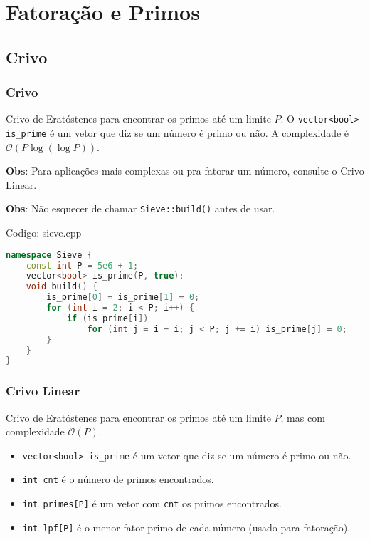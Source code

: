 \documentclass[10pt, a4paper, oneside]{book}
\begin{document}
\section{Fatoração e Primos}
\subsection{Crivo}
\subsubsection{Crivo}


Crivo de Eratóstenes para encontrar os primos até um limite $P$. O \texttt{vector<bool> is\_prime} é um vetor que diz se um número é primo ou não. A complexidade é $\mathcal{O}(P \log (\log P))$.



\textbf{Obs}: Para aplicações mais complexas ou pra fatorar um número, consulte o Crivo Linear.



\textbf{Obs}: Não esquecer de chamar \texttt{Sieve::build()} antes de usar.
\hfill

Codigo: sieve.cpp

\begin{lstlisting}[language=C++]
namespace Sieve {
    const int P = 5e6 + 1;
    vector<bool> is_prime(P, true);
    void build() {
        is_prime[0] = is_prime[1] = 0;
        for (int i = 2; i < P; i++) {
            if (is_prime[i])
                for (int j = i + i; j < P; j += i) is_prime[j] = 0;
        }
    }
}\end{lstlisting}
\hfill

\subsubsection{Crivo Linear}


Crivo de Eratóstenes para encontrar os primos até um limite $P$, mas com complexidade $\mathcal{O}(P)$.



\begin{itemize}
\item \texttt{vector<bool> is\_prime} é um vetor que diz se um número é primo ou não.
\item \texttt{int cnt} é o número de primos encontrados.
\item \texttt{int primes[P]} é um vetor com \texttt{cnt} os primos encontrados.
\item \texttt{int lpf[P]} é o menor fator primo de cada número (usado para fatoração).
\end{itemize}
\end{document}
